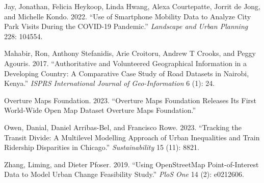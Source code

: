 \documentclass[
]{article}
\newlength{\cslhangindent}
\newenvironment{CSLReferences}[2] %
 {\begin{list}{}{%
  \setlength{\itemindent}{0pt}
  \setlength{\leftmargin}{0pt}
  \setlength{\parsep}{0pt}
  \ifodd #1
   \setlength{\leftmargin}{\cslhangindent}
   \setlength{\itemindent}{-1\cslhangindent}
  \fi
  \setlength{\itemsep}{#2\baselineskip}}}
 {\end{list}}
\begin{document}
\begin{CSLReferences}{1}{0}
Jay, Jonathan, Felicia Heykoop, Linda Hwang, Alexa Courtepatte, Jorrit
de Jong, and Michelle Kondo. 2022. {``Use of Smartphone Mobility Data to
Analyze City Park Visits During the {COVID-19} Pandemic.''}
\emph{Landscape and Urban Planning} 228: 104554.

Mahabir, Ron, Anthony Stefanidis, Arie Croitoru, Andrew T Crooks, and
Peggy Agouris. 2017. {``Authoritative and Volunteered Geographical
Information in a Developing Country: {A} Comparative Case Study of Road
Datasets in {Nairobi}, {Kenya}.''} \emph{ISPRS International Journal of
Geo-Information} 6 (1): 24.

Overture Maps Foundation. 2023. {``Overture {Maps Foundation Releases
Its First World-Wide Open Map Dataset} \textendash{} {Overture Maps
Foundation}.''}

Owen, Danial, Daniel Arribas-Bel, and Francisco Rowe. 2023. {``Tracking
the {Transit Divide}: {A Multilevel Modelling Approach} of {Urban
Inequalities} and {Train Ridership Disparities} in {Chicago}.''}
\emph{Sustainability} 15 (11): 8821.

Zhang, Liming, and Dieter Pfoser. 2019. {``Using {OpenStreetMap}
Point-of-Interest Data to Model Urban Change Feasibility
Study.''} \emph{PloS One} 14 (2): e0212606.

\end{CSLReferences}
\end{document}
